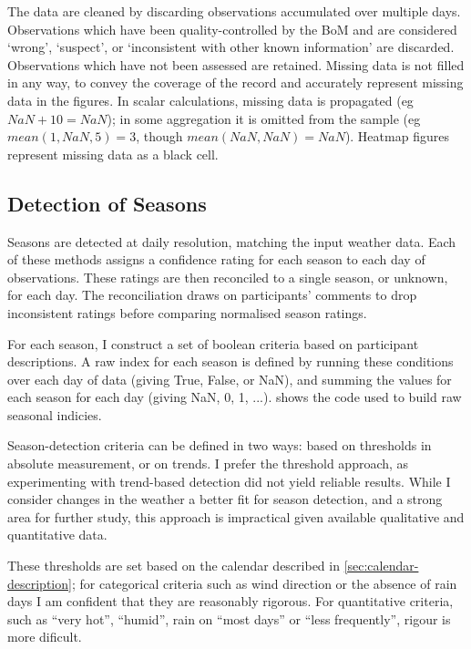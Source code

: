 The data are cleaned by discarding observations accumulated over multiple days.
Observations which have been quality-controlled by the BoM and are considered
`wrong', `suspect', or `inconsistent with other known information' are discarded.
Observations which have not been assessed are retained.
%
Missing data is not filled in any way, to convey the coverage of the record
and accurately represent missing data in the figures.  In scalar calculations,
missing data is propagated (eg ${NaN+10=NaN}$); in some aggregation
it is omitted from the sample (eg ${mean(1,NaN,5)=3}$, though
${mean(NaN,NaN)=NaN}$). Heatmap figures represent missing data as a black cell.


\subsection{Detection of Seasons}
\label{meth:seas-detection}

Seasons are detected at daily resolution, matching the input weather data.
Each of these methods assigns a confidence rating for each season to each day of
observations.  These ratings are then reconciled to a single season, or unknown,
for each day.  The reconciliation draws on participants' comments to drop inconsistent
ratings before comparing normalised season ratings.

For each season, I construct a set of boolean criteria based on participant
descriptions.  A raw index for each season is defined by
running these conditions over each day of data (giving True, False, or NaN),
and summing the values for each season for each day (giving NaN, 0, 1, ...).
 shows the code used to build raw
seasonal indicies.

Season-detection criteria can be defined in two ways: based on thresholds
in absolute measurement, or on trends.  I prefer the threshold approach,
as experimenting with trend-based detection did not yield reliable results.
While I consider changes in the weather a better fit for season detection,
and a strong area for further study, this approach is impractical given available
qualitative and quantitative data.

These thresholds are set based on the calendar described in \cref{sec:calendar-description};
for categorical criteria such as wind direction or the absence of rain days
I am confident that they are reasonably rigorous.  For quantitative criteria,
such as ``very hot'', ``humid'', rain on ``most days'' or ``less frequently'',
rigour is more dificult.

